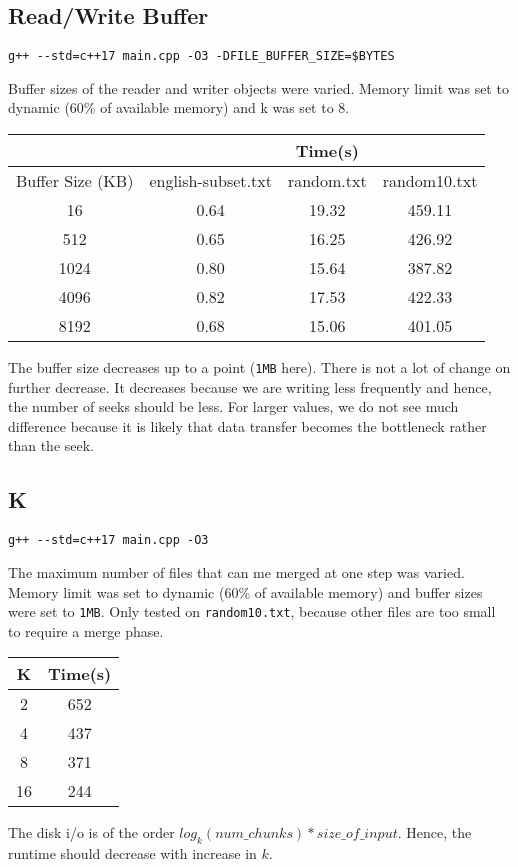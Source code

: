 \documentclass{article}
\begin{document}
\subsection{Read/Write Buffer}
\begin{lstlisting}[style = cpp]
g++ --std=c++17 main.cpp -O3 -DFILE_BUFFER_SIZE=$BYTES
\end{lstlisting}
Buffer sizes of the reader and writer objects were varied. Memory limit was set to dynamic (60\% of available memory) and k was set to $8$.
\begin{center}
\begin{tabular}{||c| c c c||} 
 \hline
&&Time(s)&\\
 \hline
 Buffer Size (KB) & english-subset.txt & random.txt & random10.txt \\ [0.5ex] 
 \hline\hline
 16 & 0.64 & 19.32 & 459.11 \\ 
 \hline
 512 & 0.65 & 16.25 & 426.92 \\
 \hline
 1024 & 0.80 & 15.64 & 387.82\\ %
 \hline
 4096 & 0.82 & 17.53 & 422.33\\ %
 \hline
 8192 & 0.68 & 15.06 & 401.05\\ %
 \hline
\end{tabular}
\end{center}
The buffer size decreases up to a point (\verb|1MB| here). There is not a lot of change on further decrease. It decreases because we are writing less frequently and hence, the number of seeks should be less. For larger values, we do not see much difference because it is likely that data transfer becomes the bottleneck rather than the seek.
\subsection{K}
\begin{lstlisting}[style = cpp]
g++ --std=c++17 main.cpp -O3
\end{lstlisting}
The maximum number of files that can me merged at one step was varied. Memory limit was set to dynamic (60\% of available memory) and buffer sizes were set to \verb|1MB|. Only tested on \verb|random10.txt|, because other files are too small to require a merge phase.
\begin{center}
\begin{tabular}{||c c||} 
 \hline
K & Time(s) \\ [0.5ex] 
 \hline\hline
 2 & 652 \\ 
 \hline
 4 & 437 \\
 \hline
 8 & 371\\ %
 \hline
 16 & 244\\ %
 \hline
\end{tabular}
\end{center}
The disk i/o is of the order $log_k(num\_chunks)*size\_of\_input$. Hence, the runtime should decrease with increase in $k$.
\end{document}
